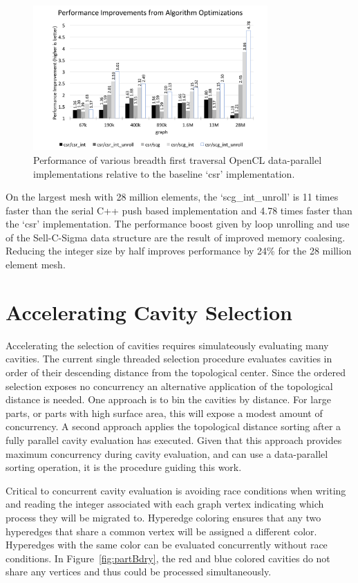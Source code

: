 \documentclass[graybox]{svmult}
\begin{document}
\begin{figure}
  \centering
  \label{fig:bfs}
  \includegraphics[width=0.8\textwidth]{images/bfsPerformance.png}
  \caption{
    Performance of various breadth first traversal OpenCL data-parallel implementations
    relative to the baseline `csr' implementation.
  }
\end{figure}

On the largest mesh with 28 million elements, the `scg\_int\_unroll' is 11 times
faster than the serial C++ push based implementation and 4.78 times faster than
the `csr' implementation.
The performance boost given by loop unrolling and use of the Sell-C-Sigma data
structure are the result of improved memory coalesing.
Reducing the integer size by half improves performance by 24\% for the 28
million element mesh.

\section{Accelerating Cavity Selection} \label{sec:select}

Accelerating the selection of cavities requires simulateously evaluating many
cavities.
The current single threaded selection procedure evaluates cavities in order of
their descending distance from the topological center.
Since the ordered selection exposes no concurrency an alternative application of
the topological distance is needed.
One approach is to bin the cavities by distance.
For large parts, or parts with high surface area, this will expose a modest
amount of concurrency.
A second approach applies the topological distance sorting after a fully
parallel cavity evaluation has executed.
Given that this approach provides maximum concurrency during cavity evaluation,
and can use a data-parallel sorting operation, it is the procedure guiding this
work.

Critical to concurrent cavity evaluation is avoiding race conditions when
writing and reading the integer associated with each graph vertex indicating
which process they will be migrated to.
Hyperedge coloring ensures that any two hyperedges that share a common vertex
will be assigned a different color.
Hyperedges with the same color can be evaluated concurrently without
race conditions.
In Figure~\ref{fig:partBdry}, the red and blue colored cavities do not share any
vertices and thus could be processed simultaneously.
\end{document}

